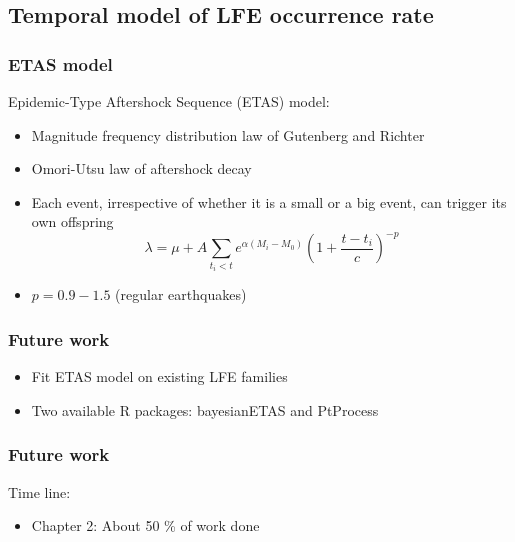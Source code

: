 \documentclass{beamer}
\begin{document}
	\subsection{Temporal model of LFE occurrence rate}

	\begin{frame}
		\frametitle{ETAS model}
		Epidemic-Type Aftershock Sequence (ETAS) model:
		\begin{itemize}
			\item Magnitude frequency distribution law of Gutenberg and Richter
			\item Omori-Utsu law of aftershock decay
			\item Each event, irrespective of whether it is a small or a big event, can trigger its own offspring
		\begin{equation*}
		\lambda = \mu + A \sum_{t_i < t} e^{\alpha \left( M_i - M_0 \right)} \left( 1 + \frac{t - t_i}{c} \right) ^{-p}
		\end{equation*}
		\item $p = 0.9 - 1.5$ (regular earthquakes)
		\end{itemize}
	\end{frame}

	\begin{frame}
		\frametitle{Future work}
		\begin{itemize}
			\item Fit ETAS model on existing LFE families
			\item Two available R packages: bayesianETAS and PtProcess
		\end{itemize}
	\end{frame}

	\begin{frame}
		\frametitle{Future work}
		Time line:

		\vspace{2em}

		\begin{itemize}
			\item Chapter 2: About 50 \% of work done
		\end{itemize}
	\end{frame}
		
\end{document}

